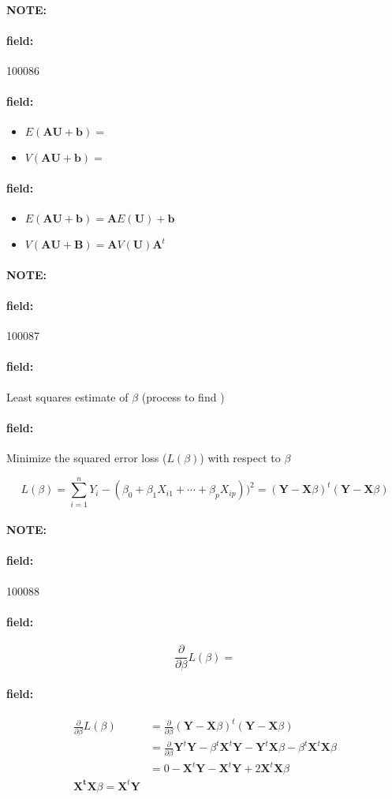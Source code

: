 \documentclass[12pt]{article}
\newenvironment{note}{\paragraph{NOTE:}}{}
\newenvironment{field}{\paragraph{field:}}{}
\begin{document}
\begin{note} \begin{field} \tiny 100086 \end{field}
 \begin{field}
  \begin{itemize}
   \item $E(\textbf{AU} + \textbf{b}) = $
   \item $V(\mathbf{AU + \mathbf{b}}) = $
  \end{itemize}
 \end{field}
 \begin{field}
  \begin{itemize}
   \item $E(\textbf{AU} + \textbf{b}) = \mathbf{A} E(\mathbf{U}) + \mathbf{b}$
   \item $V(\mathbf{AU + \mathbf{B}}) = \mathbf{A}V(\mathbf{U}) \mathbf{A}^t$
  \end{itemize}
 \end{field}
\end{note}


\begin{note} \begin{field} \tiny 100087 \end{field}
 \begin{field}
  Least squares estimate of $\beta$ (process to find )
 \end{field}
 \begin{field}
  Minimize the squared error loss ($L(\beta)$) with respect to $\beta$

  $$ L(\beta ) = \sum_{i=1}^n Y_i - (\beta_0 + \beta_1 X_{i1} + \cdots + \beta_p X_{ip}))^2 = (\mathbf{Y} - \mathbf{X}\beta)^t(\mathbf{Y} - \mathbf{X}\beta)$$
 \end{field}
\end{note}

\begin{note} \begin{field} \tiny 100088 \end{field}
 \begin{field}
  $$  \frac{\partial}{\partial \beta} L(\beta) = $$
 \end{field}
 \begin{field}
  \begin{align*}
   \frac{\partial}{\partial \beta} L(\beta) & = \frac{\partial}{\partial \beta} (\mathbf{Y} - \mathbf{X}\beta)^t(\mathbf{Y} - \mathbf{X}\beta) \\
                                            & = \frac{\partial}{\partial \beta}  \mathbf{Y}^t \mathbf{Y} - \beta^t \mathbf{X}^t
   \textbf{Y} - \mathbf{Y}^t \mathbf{X}\beta - \beta^t \mathbf{X}^t \mathbf{X} \beta                                                           \\
                                            & = 0 - \mathbf{X}^t \mathbf{Y} - \mathbf{X}^t \mathbf{Y} + 2 \mathbf{X}^t \mathbf{X} \beta        \\
   \mathbf{X^t}\mathbf{X}\beta = \mathbf{X}^t \mathbf{Y}
  \end{align*}
 \end{field}
\end{note}
\end{document}
